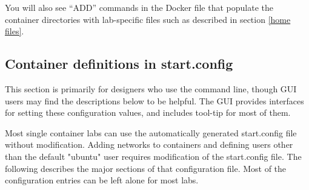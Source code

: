 \documentclass[12pt]{article}
\begin{document}
You will also see ``ADD'' commands in the Docker file that populate the container
directories with lab-specific files such as described in section \ref{home files}.

\subsection{Container definitions in start.config}
\label{start config}
This section is primarily for designers who use the command line, though GUI users may
find the descriptions below to be helpful.  The GUI provides interfaces
for setting these configuration values, and includes tool-tip for most of them.  

Most single container labs can use the automatically generated start.config file
without modification.  Adding networks to containers and defining users other than the
default "ubuntu" user requires modification of the start.config file.
The following describes the major sections of that configuration file.  Most of the configuration
entries can be left alone for most labs.
\end{document}
